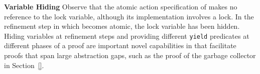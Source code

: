 {\bf Variable Hiding} Observe that the atomic action specification of
 makes no reference to the lock variable,
although its implementation involves a lock. In the refinement step in
which  becomes atomic, the lock variable has
been hidden. Hiding variables at refinement steps and providing
different {\tt yield} predicates at different phases of a proof are
important novel capabilities in \civl that facilitate proofs that span
large abstraction gaps, such as the proof of the garbage collector in
Section~\ref{}. 

